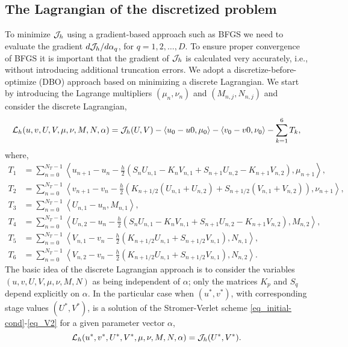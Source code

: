 \documentclass[11pt]{article}
\begin{document}
\subsection{The Lagrangian of the discretized problem}
To minimize ${\cal J}_h$ using a gradient-based approach such as BFGS we need to evaluate the gradient
$d {\cal J}_h/ d\alpha_q$, for $q=1,2,\ldots,D$. To ensure proper convergence of BFGS it is important that the
gradient of ${\cal J}_h$ is calculated very accurately, i.e., without introducing additional truncation errors. We
adopt a discretize-before-optimize (DBO) approach based on minimizing a discrete Lagrangian. We start by
introducing the Lagrange multipliers $(\mu_n,\nu_n)$ and $(M_{n,j}, N_{n,j})$ and consider the discrete Lagrangian,
\begin{equation}
{\cal L}_h(u,v,U,V, \mu,\nu,M,N,\alpha) = {\cal J}_h(U,V) - \langle u_0 - u0, \mu_0\rangle - \langle
v_0 - v0, \nu_0\rangle - \sum_{k=1}^6 T_k,
\end{equation}
where,
\begin{align}
T_1 &= \sum_{n=0}^{N_T-1} \left\langle u_{n+1} - u_n - \frac{h}{2}\left(S_nU_{n,1} - K_nV_{n,1} + S_{n+1}U_{n,2} - K_{n+1}V_{n,2}
  \right), \mu_{n+1} \right\rangle,\\
T_2 &= \sum_{n=0}^{N_T-1} \left\langle v_{n+1} - v_n - \frac{h}{2}\left(K_{n+1/2} \left(U_{n,1} + U_{n,2}\right) + S_{n+1/2}\left(
  V_{n,1} +  V_{n,2}\right) \right), \nu_{n+1} \right\rangle,\\
T_3 &= \sum_{n=0}^{N_T-1} \left\langle U_{n,1} - u_n, M_{n,1} \right\rangle,\\
T_4 &= \sum_{n=0}^{N_T-1} \left\langle U_{n,2} - u_n - \frac{h}{2}\left(S_nU_{n,1} - K_nV_{n,1} + S_{n+1}U_{n,2} -
  K_{n+1}V_{n,2} \right), M_{n,2} \right\rangle,\\
T_5 &= \sum_{n=0}^{N_T-1} \left\langle V_{n,1} - v_n - \frac{h}{2}\left(  K_{n+1/2} U_{n,1} + S_{n+1/2} V_{n,1} \right), N_{n,1} \right\rangle,\\
T_6 &= \sum_{n=0}^{N_T-1} \left\langle V_{n,2} - v_n - \frac{h}{2}\left(  K_{n+1/2} U_{n,1} + S_{n+1/2} V_{n,1} \right), N_{n,2} \right\rangle.
\end{align}
The basic idea of the discrete Lagrangian approach is to consider the variables $(u,v,U,V, \mu,\nu,M,N)$ as being independent of
$\alpha$; only the matrices $K_p$ and $S_q$ depend explicitly on $\alpha$. In the particular case
when $(u^*,v^*)$, with
corresponding stage values $(U^*,V^*)$, is a solution of the Stromer-Verlet scheme
\eqref{eq_initial-cond}-\eqref{eq_V2} for a given parameter vector $\alpha$,
\[
{\cal L}_h(u^*,v^*,U^*,V^*, \mu,\nu,M,N,\alpha) = {\cal J}_h(U^*,V^*).
\]
\end{document}
